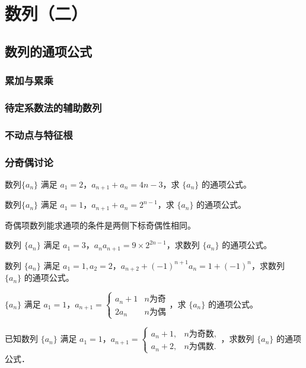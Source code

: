 \chapter{数列（二）}
\section{数列的通项公式}
\subsection{累加与累乘}
\clearpage
\subsection{待定系数法的辅助数列}
\clearpage
\subsection{不动点与特征根}
\clearpage
\subsection{分奇偶讨论}
\begin{example}
    数列\(\{a_n\}\) 满足 \(a_1 = 2\)，\(a_{n+1} + a_n = 4n - 3\)，求 \(\{a_n\}\) 的通项公式。
\end{example}
\begin{exercise}
    数列\(\{a_n\}\) 满足 \(a_1 = 1\)，\(a_{n+1} + a_n = 2^{n-1}\)，求 \(\{a_n\}\) 的通项公式。
\end{exercise}

奇偶项数列能求通项的条件是两侧下标奇偶性相同。

\begin{example}
数列 \(\{a_n\}\) 满足 \(a_1 = 3\)，\(a_n a_{n+1} = 9 \times 2^{2n-1}\)，求数列 \(\{a_n\}\) 的通项公式。
\end{example}

\begin{example}
    数列 \(\{a_n\}\) 满足 \(a_1=1, a_2 = 2\)，\(a_{n+2} + (-1)^{n+1} a_n = 1 + (-1)^n\)，求数列 \(\{a_n\}\) 的通项公式。
\end{example}

\begin{example}
    \(\{a_n\}\) 满足 \(a_1 = 1\)，\(a_{n+1} = \begin{cases} 
        a_n + 1 & n \text{为奇} \\
        2a_n & n \text{为偶}
        \end{cases}\)，求 \(\{a_n\}\) 的通项公式。
\end{example}
\begin{exercise}
    已知数列 \(\{a_n\}\) 满足 \(a_1 = 1\)，\(a_{n+1} = 
\begin{cases} 
a_n + 1, & n \text{为奇数}, \\
a_n + 2, & n \text{为偶数}.
\end{cases}\)，求数列 \(\{a_n\}\) 的通项公式．

\end{exercise}

